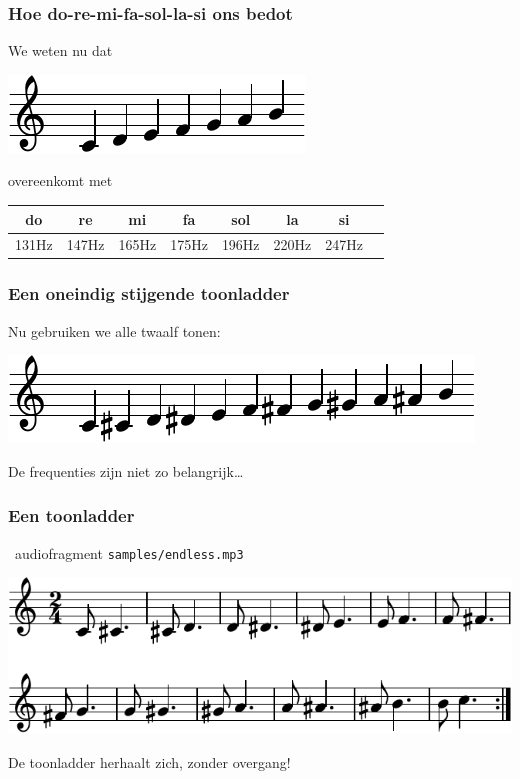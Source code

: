 \documentclass[compress, darktitle, framenumber, totalframenumber]{beamer}
\begin{document}
\begin{frame}
  \frametitle{Hoe do-re-mi-fa-sol-la-si ons bedot}

  We weten nu dat
  \begin{center}
    \includegraphics{scores/scale-cropped}
  \end{center}
  overeenkomt met
  \begin{center}
    \begin{tabular}[h]{cccccccc}
      do & re & mi & fa & sol & la & si \\\midrule
      131Hz & 147Hz & 165Hz & 175Hz & 196Hz & 220Hz & 247Hz
    \end{tabular}
  \end{center}
\end{frame}

\begin{frame}
  \frametitle{Een oneindig stijgende toonladder}

  Nu gebruiken we alle twaalf tonen:
  \begin{center}
    \includegraphics{scores/scale-full-cropped}
  \end{center}
  De frequenties zijn niet zo belangrijk\ldots
\end{frame}

\begin{frame}
  \frametitle{Een toonladder}

  \begin{block}{\twonotes\ audiofragment}
    \texttt{samples/endless.mp3}
  \end{block}
  \pause
  \begin{center}
    \includegraphics{scores/endless-cropped}
  \end{center}
  \pause
  De toonladder \alert{herhaalt} zich, zonder overgang!
\end{frame}
\end{document}

